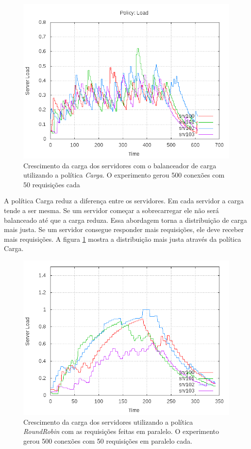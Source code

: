\begin{figure}[htb!]
    \centering
    \includegraphics[scale=0.5]{img/balancer-serial-load}
    \caption{Crescimento da carga dos servidores com o balanceador de carga
    utilizando a política \emph{Carga}. O experimento gerou 500 conexões com 
    50 requisições cada}
    \label{fig:balancer-serial-load}
\end{figure}

A política Carga reduz a diferença entre os servidores.
Em cada servidor a carga tende a ser mesma.
Se um servidor começar a sobrecarregar ele não será balanceado até que a 
carga reduza. 
Essa abordagem torna a distribuição de carga mais justa.
Se um servidor consegue responder mais requisições, ele 
deve receber mais requisições.
A figura \ref{fig:balancer-serial-load} mostra a distribuição mais justa 
através da política Carga.

\begin{figure}[htb!]
    \centering
    \includegraphics[scale=0.5]{img/balancer-parallel-rr}
    \caption{Crescimento da carga dos servidores utilizando a política 
    \emph{RoundRobin} com as requisições feitas em paralelo. O experimento
    gerou 500 conexões com 50 requisições em paralelo cada.}
    \label{fig:balancer-parallel-rr}
\end{figure}

